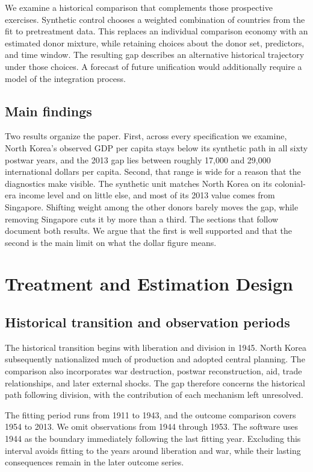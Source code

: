 \documentclass[12pt]{article}
\begin{document}
We examine a historical comparison that complements those prospective exercises. Synthetic control chooses a weighted combination of countries from the fit to pretreatment data. This replaces an individual comparison economy with an estimated donor mixture, while retaining choices about the donor set, predictors, and time window. The resulting gap describes an alternative historical trajectory under those choices. A forecast of future unification would additionally require a model of the integration process.

\subsection{Main findings}
Two results organize the paper. First, across every specification we examine, North Korea's observed GDP per capita stays below its synthetic path in all sixty postwar years, and the 2013 gap lies between roughly 17,000 and 29,000 international dollars per capita. Second, that range is wide for a reason that the diagnostics make visible. The synthetic unit matches North Korea on its colonial-era income level and on little else, and most of its 2013 value comes from Singapore. Shifting weight among the other donors barely moves the gap, while removing Singapore cuts it by more than a third. The sections that follow document both results. We argue that the first is well supported and that the second is the main limit on what the dollar figure means.

\section{Treatment and Estimation Design}

\subsection{Historical transition and observation periods}
The historical transition begins with liberation and division in 1945. North Korea subsequently nationalized much of production and adopted central planning. The comparison also incorporates war destruction, postwar reconstruction, aid, trade relationships, and later external shocks. The gap therefore concerns the historical path following division, with the contribution of each mechanism left unresolved.

The fitting period runs from 1911 to 1943, and the outcome comparison covers 1954 to 2013. We omit observations from 1944 through 1953. The software uses 1944 as the boundary immediately following the last fitting year. Excluding this interval avoids fitting to the years around liberation and war, while their lasting consequences remain in the later outcome series.
\end{document}
